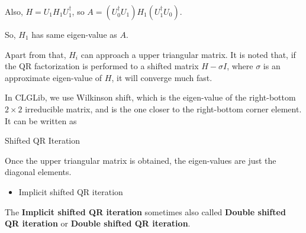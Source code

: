 Also, $H=U_1H_1U_1^{\dagger}$, so $A=(U_0^{\dagger}U_1)H_1(U_1^{\dagger}U_0)$.

So, $H_1$ has same eigen-value as $A$.

Apart from that, $H_i$ can approach a upper triangular matrix. It is noted that, if the QR factorization is performed to a shifted matrix $H-\sigma I$, where $\sigma$ is an approximate eigen-value of $H$, it will converge much fast.

In CLGLib, we use Wilkinson shift, which is the eigen-value of the right-bottom $2\times 2$ irreducible matrix, and is the one closer to the right-bottom corner element. It can be written as
\begin{algorithm}[H]
\begin{algorithmic}
    \EndIf
\EndFor

\end{algorithmic}
\caption{Shifted QR Iteration}
\end{algorithm}

Once the upper triangular matrix is obtained, the eigen-values are just the diagonal elements.

\begin{itemize}
  \item {}Implicit shifted QR iteration
\end{itemize}

The \textbf{Implicit shifted QR iteration} sometimes also called \textbf{Double shifted QR iteration} or \textbf{Double shifted QR iteration}.

